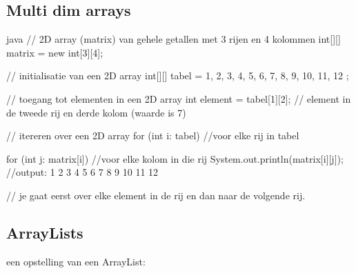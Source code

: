 \documentclass[a4paper,11pt]{article}
\begin{document}
\subsection{Multi dim arrays}

\begin{codeblock}{java}
    // 2D array (matrix) van gehele getallen met 3 rijen en 4 kolommen
    int[][] matrix = new int[3][4];

    // initialisatie van een 2D array
    int[][] tabel = {
        {1, 2, 3, 4},
        {5, 6, 7, 8},
        {9, 10, 11, 12}
    };

    // toegang tot elementen in een 2D array
    int element = tabel[1][2]; // element in de tweede rij en derde kolom (waarde is 7)

    // itereren over een 2D array
    for (int i: tabel) //voor elke rij in tabel
    {
        for (int j: matrix[i]) //voor elke kolom in die rij
        {
            System.out.println(matrix[i][j]);
            //output: 1 2 3 4 5 6 7 8 9 10 11 12
        }

        // je gaat eerst over elke element in de rij en 
        dan naar de volgende rij.
    }
\end{codeblock}

\subsection{ArrayLists}
een opstelling van een ArrayList:
\end{document}
